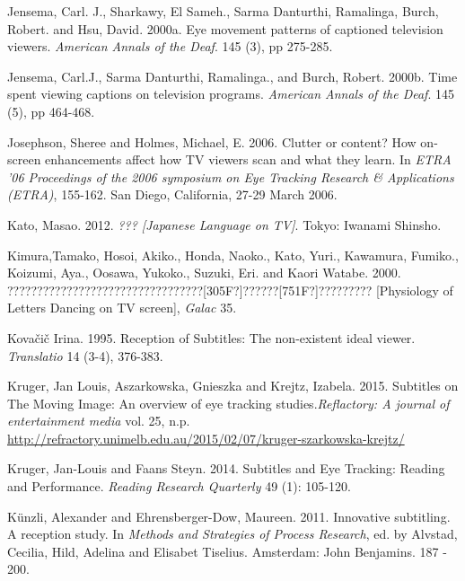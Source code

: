 \documentclass[output=paper]{langsci/langscibook}
\begin{document}
Jensema, Carl. J., Sharkawy, El Sameh., Sarma Danturthi, Ramalinga, Burch, Robert. and Hsu, David. 2000a. Eye movement patterns of captioned television viewers. \textit{American Annals of the Deaf}. 145 (3), pp 275-285.



Jensema, Carl.J., Sarma Danturthi, Ramalinga., and Burch, Robert. 2000b. Time spent viewing captions on television programs. \textit{American Annals of the Deaf}. 145 (5), pp 464-468.



Josephson, Sheree and Holmes, Michael, E. 2006. Clutter or content? How on-screen enhancements affect how TV viewers scan and what they learn. In \textit{ETRA '06 Proceedings of the 2006 symposium on Eye Tracking Research \& Applications (ETRA)}, 155-162. San Diego, California, 27-29 March 2006.



Kato, Masao. 2012. \textit{??? [Japanese Language on TV]}. Tokyo: Iwanami Shinsho.



Kimura,Tamako, Hosoi, Akiko., Honda, Naoko., Kato, Yuri., Kawamura, Fumiko., Koizumi, Aya., Oosawa, Yukoko., Suzuki, Eri. and Kaori Watabe. 2000. ?????????????????????????????????[305F?]??????[751F?]????????? [Physiology of Letters Dancing on TV screen], \textit{Galac} 35.



Kova\v{c}i\v{c} Irina. 1995. Reception of Subtitles: The non-existent ideal viewer. \textit{Translatio} 14 (3-4), 376-383.



Kruger, Jan Louis, Aszarkowska, Gnieszka and Krejtz, Izabela. 2015. Subtitles on The Moving Image: An overview of eye tracking studies\MakeUppercase{.}\textit{Reflactory: A journal of entertainment media} vol. 25, n.p. \url{http://refractory.unimelb.edu.au/2015/02/07/kruger-szarkowska-krejtz/}



Kruger, Jan-Louis and Faans Steyn. 2014. Subtitles and Eye Tracking: Reading and Performance. \textit{Reading Research Quarterly} 49 (1): 105-120.



K\"{u}nzli, Alexander and Ehrensberger-Dow, Maureen. 2011. Innovative subtitling. A reception study. In \textit{Methods and Strategies of Process Research}, ed. by Alvstad, Cecilia, Hild, Adelina and Elisabet Tiselius. Amsterdam: John Benjamins. 187 - 200.
\end{document}
